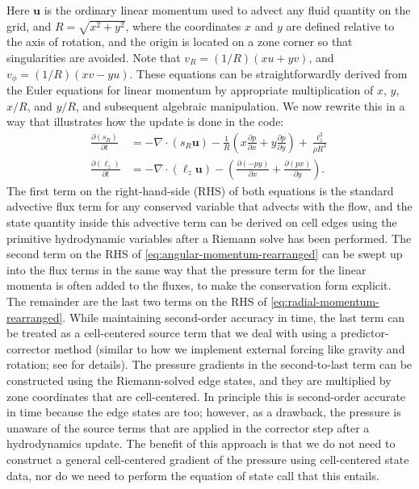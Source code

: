 \documentclass[12pt]{article}
\begin{document}
Here $\mathbf{u}$ is the ordinary linear momentum used to advect any fluid quantity
on the grid, and $R = \sqrt{x^2 + y^2}$, where the coordinates $x$ and $y$ are defined
relative to the axis of rotation, and the origin is located on a zone corner
so that singularities are avoided. Note that $v_R = (1 / R)(x u + y v)$, and
$v_\phi = (1/R)(x v - y u)$. These equations can be straightforwardly derived from
the Euler equations for linear momentum by appropriate multiplication of $x$, $y$,
$x / R$, and $y/R$, and subsequent algebraic manipulation. We now rewrite this in a way
that illustrates how the update is done in the code:
\begin{align}
  \frac{\partial(s_R)}{\partial t} &= -\nabla \cdot (s_R \mathbf{u})
    - \frac{1}{R}\left(x \frac{\partial p}{\partial x} + y \frac{\partial p}{\partial y}\right)
    + \frac{\ell_z^2}{\rho R^3} \label{eq:radial-momentum-rearranged}\\
    \frac{\partial(\ell_z)}{\partial t} &= -\nabla \cdot (\ell_z \mathbf{u}) - \left(\frac{\partial (-py)}{\partial x} + \frac{\partial(px)}{\partial y}\right).\label{eq:angular-momentum-rearranged}
\end{align}
The first term on the right-hand-side (RHS) of both equations is the standard advective
flux term for any conserved variable that advects with the flow, and the state quantity
inside this advective term can be derived on cell edges using the primitive hydrodynamic
variables after a Riemann solve has been performed. The second term on the RHS of
\autoref{eq:angular-momentum-rearranged} can be swept up into the flux terms in the
same way that the pressure term for the linear momenta is often added to the fluxes,
to make the conservation form explicit. The remainder are the last two terms on the
RHS of \autoref{eq:radial-momentum-rearranged}.
While maintaining second-order accuracy in time, the last term can be treated as a
cell-centered source term that we deal with using a predictor-corrector
method (similar to how we implement external forcing like gravity and rotation; see
\cite{castro} for details). The pressure gradients in the second-to-last term can be
constructed using the Riemann-solved edge states, and they are multiplied by zone
coordinates that are cell-centered. In principle this is second-order accurate in time
because the edge states are too; however, as a drawback, the pressure is unaware of the
source terms that are applied in the corrector step after a hydrodynamics update. The
benefit of this approach is that we do not need to construct a general cell-centered
gradient of the pressure using cell-centered state data, nor do we need to perform the
equation of state call that this entails.
\end{document}
